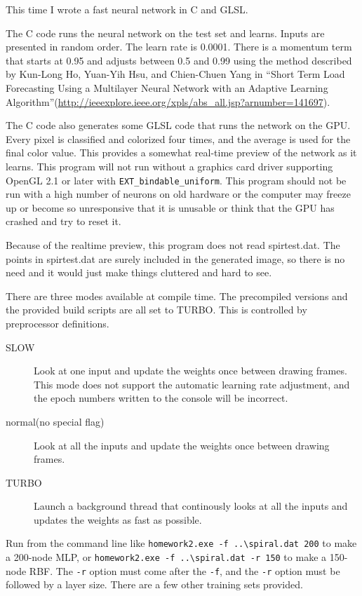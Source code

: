 \documentclass[11pt]{article}
\begin{document}
This time I wrote a fast neural network in C and GLSL.

The C code runs the neural network on the test set and learns. Inputs are presented in random order. The learn rate is 0.0001. There is a momentum term that starts at 0.95 and adjusts between 0.5 and 0.99 using the method described by Kun-Long Ho, Yuan-Yih Hsu, and Chien-Chuen Yang in ``Short Term Load Forecasting Using a Multilayer Neural Network with an Adaptive Learning Algorithm''(\url{http://ieeexplore.ieee.org/xpls/abs_all.jsp?arnumber=141697}).

The C code also generates some GLSL code that runs the network on the GPU. Every pixel is classified and colorized four times, and the average is used for the final color value. This provides a somewhat real-time preview of the network as it learns. This program will not run without a graphics card driver supporting OpenGL 2.1 or later with \texttt{EXT\_bindable\_uniform}. This program should not be run with a high number of neurons on old hardware or the computer may freeze up or become so unresponsive that it is unusable or think that the GPU has crashed and try to reset it.

Because of the realtime preview, this program does not read spirtest.dat. The points in spirtest.dat are surely included in the generated image, so there is no need and it would just make things cluttered and hard to see.

There are three modes available at compile time. The precompiled versions and the provided build scripts are all set to TURBO. This is controlled by preprocessor definitions.
\begin{description}
\item[SLOW] Look at one input and update the weights once between drawing frames. This mode does not support the automatic learning rate adjustment, and the epoch numbers written to the console will be incorrect.
\item[normal(no special flag)] Look at all the inputs and update the weights once between drawing frames.
\item[TURBO] Launch a background thread that continously looks at all the inputs and updates the weights as fast as possible.
\end{description}

Run from the command line like \texttt{homework2.exe -f ..\textbackslash spiral.dat 200} to make a 200-node MLP, or \texttt{homework2.exe -f ..\textbackslash spiral.dat -r 150} to make a 150-node RBF. The \texttt{-r} option must come after the \texttt{-f}, and the \texttt{-r} option must be followed by a layer size. There are a few other training sets provided.
\end{document}
